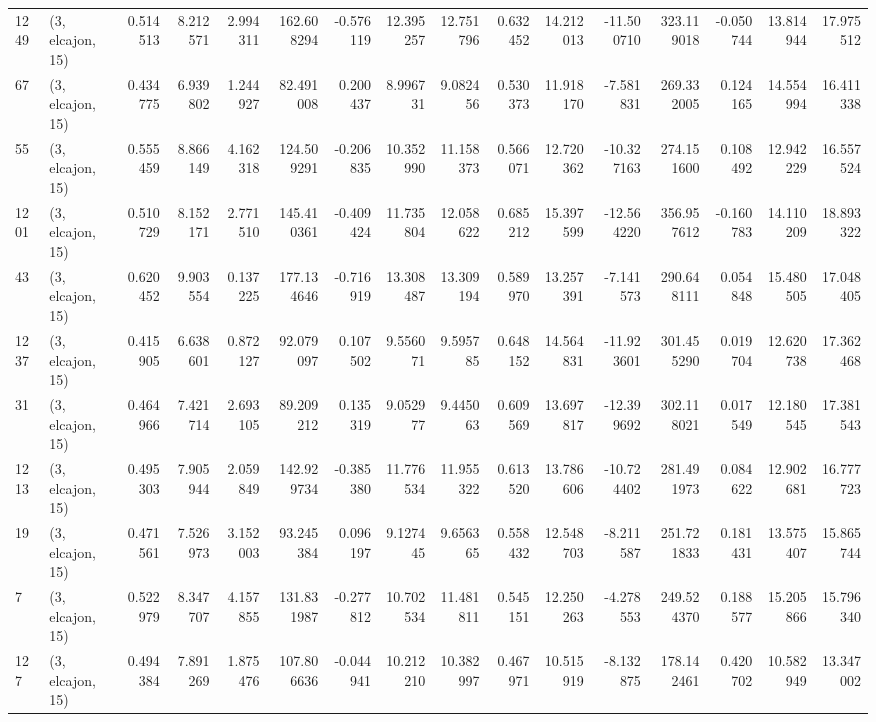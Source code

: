 \begin{tabular}{llrrrrrrrrrrrrrr}
1249 &  (3, elcajon, 15) &   0.514513 &   8.212571 &   2.994311 &    162.608294 &   -0.576119 &   12.395257 &   12.751796 &  0.632452 &  14.212013 & -11.500710 &   323.119018 &  -0.050744 &  13.814944 &  17.975512 \\
67   &  (3, elcajon, 15) &   0.434775 &   6.939802 &   1.244927 &     82.491008 &    0.200437 &    8.996731 &    9.082456 &  0.530373 &  11.918170 &  -7.581831 &   269.332005 &   0.124165 &  14.554994 &  16.411338 \\
55   &  (3, elcajon, 15) &   0.555459 &   8.866149 &   4.162318 &    124.509291 &   -0.206835 &   10.352990 &   11.158373 &  0.566071 &  12.720362 & -10.327163 &   274.151600 &   0.108492 &  12.942229 &  16.557524 \\
1201 &  (3, elcajon, 15) &   0.510729 &   8.152171 &   2.771510 &    145.410361 &   -0.409424 &   11.735804 &   12.058622 &  0.685212 &  15.397599 & -12.564220 &   356.957612 &  -0.160783 &  14.110209 &  18.893322 \\
43   &  (3, elcajon, 15) &   0.620452 &   9.903554 &   0.137225 &    177.134646 &   -0.716919 &   13.308487 &   13.309194 &  0.589970 &  13.257391 &  -7.141573 &   290.648111 &   0.054848 &  15.480505 &  17.048405 \\
1237 &  (3, elcajon, 15) &   0.415905 &   6.638601 &   0.872127 &     92.079097 &    0.107502 &    9.556071 &    9.595785 &  0.648152 &  14.564831 & -11.923601 &   301.455290 &   0.019704 &  12.620738 &  17.362468 \\
31   &  (3, elcajon, 15) &   0.464966 &   7.421714 &   2.693105 &     89.209212 &    0.135319 &    9.052977 &    9.445063 &  0.609569 &  13.697817 & -12.399692 &   302.118021 &   0.017549 &  12.180545 &  17.381543 \\
1213 &  (3, elcajon, 15) &   0.495303 &   7.905944 &   2.059849 &    142.929734 &   -0.385380 &   11.776534 &   11.955322 &  0.613520 &  13.786606 & -10.724402 &   281.491973 &   0.084622 &  12.902681 &  16.777723 \\
19   &  (3, elcajon, 15) &   0.471561 &   7.526973 &   3.152003 &     93.245384 &    0.096197 &    9.127445 &    9.656365 &  0.558432 &  12.548703 &  -8.211587 &   251.721833 &   0.181431 &  13.575407 &  15.865744 \\
7    &  (3, elcajon, 15) &   0.522979 &   8.347707 &   4.157855 &    131.831987 &   -0.277812 &   10.702534 &   11.481811 &  0.545151 &  12.250263 &  -4.278553 &   249.524370 &   0.188577 &  15.205866 &  15.796340 \\
127  &  (3, elcajon, 15) &   0.494384 &   7.891269 &   1.875476 &    107.806636 &   -0.044941 &   10.212210 &   10.382997 &  0.467971 &  10.515919 &  -8.132875 &   178.142461 &   0.420702 &  10.582949 &  13.347002 \\

\end{tabular}

